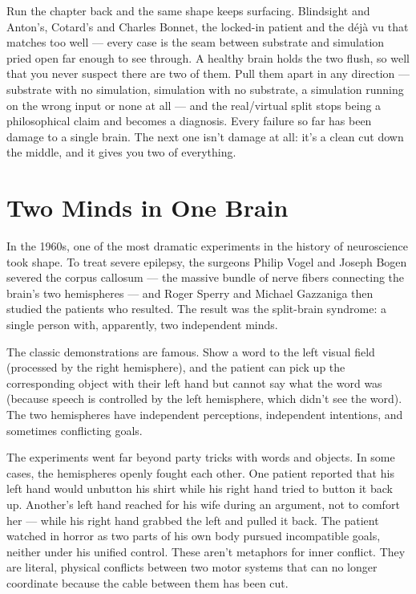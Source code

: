 \documentclass[11pt, twoside, openright]{book}
\begin{document}
Run the chapter back and the same shape keeps surfacing. Blindsight and Anton's, Cotard's and Charles Bonnet, the locked-in patient and the déjà vu that matches too well --- every case is the seam between substrate and simulation pried open far enough to see through. A healthy brain holds the two flush, so well that you never suspect there are two of them. Pull them apart in any direction --- substrate with no simulation, simulation with no substrate, a simulation running on the wrong input or none at all --- and the real/virtual split stops being a philosophical claim and becomes a diagnosis. Every failure so far has been damage to a single brain. The next one isn't damage at all: it's a clean cut down the middle, and it gives you two of everything.


\chapter{Two Minds in One Brain}

In the 1960s, one of the most dramatic experiments in the history of neuroscience took shape. To treat severe epilepsy, the surgeons Philip Vogel and Joseph Bogen severed the corpus callosum --- the massive bundle of nerve fibers connecting the brain's two hemispheres --- and Roger Sperry and Michael Gazzaniga then studied the patients who resulted. The result was the split-brain syndrome: a single person with, apparently, two independent minds.

The classic demonstrations are famous. Show a word to the left visual field (processed by the right hemisphere), and the patient can pick up the corresponding object with their left hand but cannot say what the word was (because speech is controlled by the left hemisphere, which didn't see the word). The two hemispheres have independent perceptions, independent intentions, and sometimes conflicting goals.

The experiments went far beyond party tricks with words and objects. In some cases, the hemispheres openly fought each other. One patient reported that his left hand would unbutton his shirt while his right hand tried to button it back up. Another's left hand reached for his wife during an argument, not to comfort her --- while his right hand grabbed the left and pulled it back. The patient watched in horror as two parts of his own body pursued incompatible goals, neither under his unified control. These aren't metaphors for inner conflict. They are literal, physical conflicts between two motor systems that can no longer coordinate because the cable between them has been cut.
\end{document}
